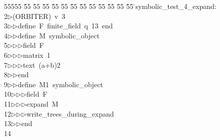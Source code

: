 %
%
\begin{tabbing}
55555 \= 55 \= 55 \= 55 \= 55 \= 55 \= 55 \= 55 \= 55 \= 55 \= 55 \= 55 \= 55 \= \>symbolic\_test\_4\_expand:\\[0pt]
2\>$\triangleright$\>(ORBITER)\ v\ 3\ \\[0pt]
3\>$\triangleright$\>$\triangleright$\>define\ F\ finite\_field\ q\ 13\ end\ \\[0pt]
4\>$\triangleright$\>$\triangleright$\>define\ M\ symbolic\_object\ \\[0pt]
5\>$\triangleright$\>$\triangleright$\>$\triangleright$\>field\ F\ \\[0pt]
6\>$\triangleright$\>$\triangleright$\>$\triangleright$\>matrix\ 1\ \\[0pt]
7\>$\triangleright$\>$\triangleright$\>$\triangleright$\>text\ (a+b)2\ \\[0pt]
8\>$\triangleright$\>$\triangleright$\>end\ \\[0pt]
9\>$\triangleright$\>$\triangleright$\>define\ M1\ symbolic\_object\ \\[0pt]
10\>$\triangleright$\>$\triangleright$\>$\triangleright$\>field\ F\ \\[0pt]
11\>$\triangleright$\>$\triangleright$\>$\triangleright$\>expand\ M\ \\[0pt]
12\>$\triangleright$\>$\triangleright$\>$\triangleright$\>write\_trees\_during\_expand\ \\[0pt]
13\>$\triangleright$\>$\triangleright$\>end\\[0pt]
14\>\end{tabbing}
